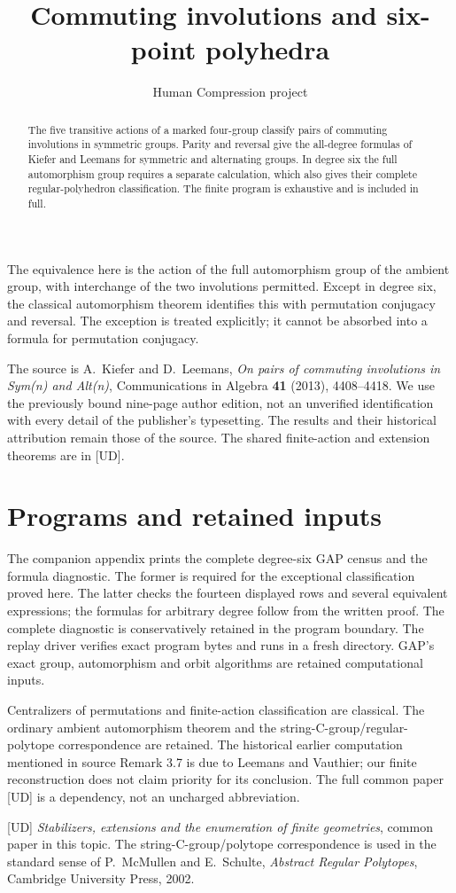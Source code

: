 
\title{Commuting involutions and six-point polyhedra}
\author{Human Compression project}
\date{}

\maketitle
\begin{abstract}
The five transitive actions of a marked four-group classify pairs of
commuting involutions in symmetric groups. Parity and reversal give the
all-degree formulas of Kiefer and Leemans for symmetric and alternating
groups. In degree six the full automorphism group requires a separate
calculation, which also gives their complete regular-polyhedron
classification. The finite program is exhaustive and is included in full.
\end{abstract}
The equivalence here is the action of the full automorphism group of the
ambient group, with interchange of the two involutions permitted. Except
in degree six, the classical automorphism theorem identifies this with
permutation conjugacy and reversal. The exception is treated explicitly;
it cannot be absorbed into a formula for permutation conjugacy.

The source is A.~Kiefer and D.~Leemans, \emph{On pairs of commuting involutions
in Sym(n) and Alt(n)}, Communications in Algebra \textbf{41} (2013),
4408--4418. We use the previously bound nine-page author edition, not an
unverified identification with every detail of the publisher's typesetting.
The results and their historical attribution remain those of the source.
The shared finite-action and extension theorems are in [UD].


\section*{Programs and retained inputs}
The companion appendix prints the complete degree-six GAP census and the
formula diagnostic. The former is required for the exceptional classification
proved here. The latter checks the fourteen displayed rows and several
equivalent expressions; the formulas for arbitrary degree follow from the
written proof. The complete diagnostic is conservatively retained in the
program boundary. The replay driver verifies exact program bytes and runs
in a fresh directory. GAP's exact group, automorphism and orbit algorithms
are retained computational inputs.

Centralizers of permutations and finite-action classification are classical.
The ordinary ambient automorphism theorem and the string-C-group/regular-
polytope correspondence are retained. The historical earlier computation
mentioned in source Remark 3.7 is due to Leemans and Vauthier; our finite
reconstruction does not claim priority for its conclusion. The full common
paper [UD] is a dependency, not an uncharged abbreviation.

[UD] \emph{Stabilizers, extensions and the enumeration of finite geometries},
common paper in this topic. The string-C-group/polytope correspondence is
used in the standard sense of P.~McMullen and E.~Schulte,
\emph{Abstract Regular Polytopes}, Cambridge University Press, 2002.

